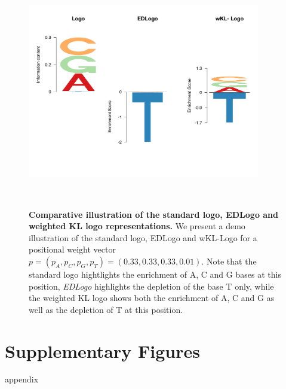 \documentclass{bmcart}
\begin{document}
\begin{figure}[h!]
\centering
\includegraphics[height=4in,width=4in]{figures/Figure2.pdf}
\caption{ \textbf{Comparative illustration of the standard logo, EDLogo and weighted KL logo representations.}
      We present a demo illustration of the standard logo, EDLogo and wKL-Logo for a positional weight vector $p = (p_A, p_C, p_G, p_T) = (0.33, 0.33, 0.33, 0.01)$. Note that the standard logo hightlights the enrichment of A, C and G bases at this position, \textit{EDLogo} highlights the depletion of the base T only, while the weighted KL logo shows both the enrichment of A, C and G as well as the depletion of T at this position.}
\label{fig:fig1}
\end{figure}

\clearpage
\section*{Supplementary Figures}
\newpage

appendix
\setcounter{page}{1}
\setcounter{figure}{0}
\setcounter{table}{0}
\renewcommand\thefigure{S\arabic{figure}}
\renewcommand\thetable{S\arabic{table}}
\end{document}
